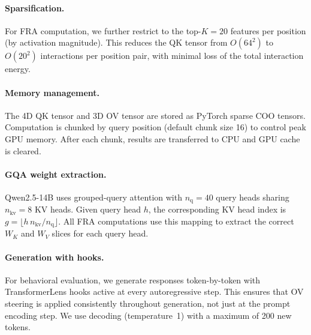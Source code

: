 \documentclass{article}
\theoremstyle{plain}
\theoremstyle{definition}
\theoremstyle{remark}
\newcommand{\WK}{W_K}
\newcommand{\WV}{W_V}
\newcommand{\dmodel}{d_{\mathrm{model}}}
\newcommand{\dhead}{d_{\mathrm{head}}}
\begin{document}
\paragraph{Sparsification.} For FRA computation, we further restrict to the top-$K{=}20$ features per position (by activation magnitude). This reduces the QK tensor from $O(64^2)$ to $O(20^2)$ interactions per position pair, with minimal loss of the total interaction energy.

\paragraph{Memory management.} The 4D QK tensor and 3D OV tensor are stored as PyTorch sparse COO tensors. Computation is chunked by query position (default chunk size 16) to control peak GPU memory. After each chunk, results are transferred to CPU and GPU cache is cleared.


\paragraph{GQA weight extraction.} Qwen2.5-14B uses grouped-query attention with $n_{\mathrm{q}} = 40$ query heads sharing $n_{\mathrm{kv}} = 8$ KV heads. Given query head $h$, the corresponding KV head index is $g = \lfloor h\, n_{\mathrm{kv}} / n_{\mathrm{q}} \rfloor$. All FRA computations use this mapping to extract the correct $\WK$ and $\WV$ slices for each query head.


\paragraph{Generation with hooks.} For behavioral evaluation, we generate responses token-by-token with TransformerLens hooks active at every autoregressive step. This ensures that OV steering is applied consistently throughout generation, not just at the prompt encoding step. We use decoding (temperature~1) with a maximum of 200 new tokens.
\end{document}
